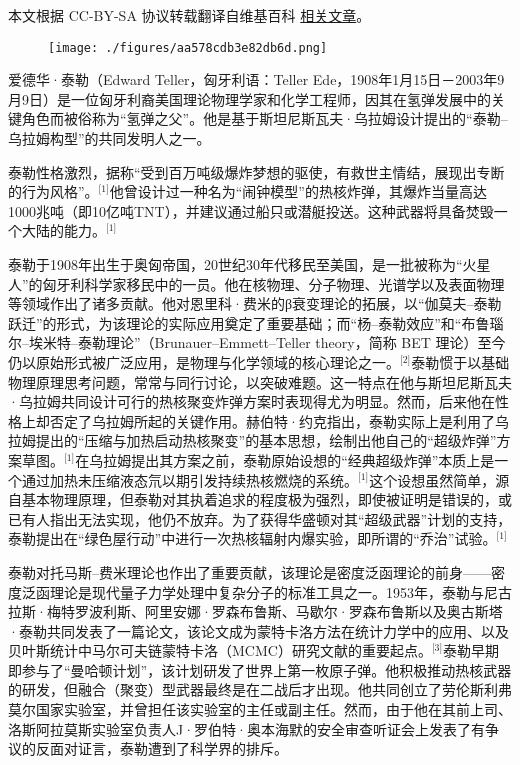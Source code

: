
本文根据 CC-BY-SA 协议转载翻译自维基百科 \href{https://en.wikipedia.org/wiki/Edward_Teller}{相关文章}。

\begin{figure}[ht]
\centering
\texttt{[image: ./figures/aa578cdb3e82db6d.png]}
\caption{} \label{fig_ADHTL_1}
\end{figure}
爱德华·泰勒（Edward Teller，匈牙利语：Teller Ede，1908年1月15日－2003年9月9日）是一位匈牙利裔美国理论物理学家和化学工程师，因其在氢弹发展中的关键角色而被俗称为“氢弹之父”。他是基于斯坦尼斯瓦夫·乌拉姆设计提出的“泰勒–乌拉姆构型”的共同发明人之一。

泰勒性格激烈，据称“受到百万吨级爆炸梦想的驱使，有救世主情结，展现出专断的行为风格”。\(^\text{[1]}\)他曾设计过一种名为“闹钟模型”的热核炸弹，其爆炸当量高达1000兆吨（即10亿吨TNT），并建议通过船只或潜艇投送。这种武器将具备焚毁一个大陆的能力。\(^\text{[1]}\)

泰勒于1908年出生于奥匈帝国，20世纪30年代移民至美国，是一批被称为“火星人”的匈牙利科学家移民中的一员。他在核物理、分子物理、光谱学以及表面物理等领域作出了诸多贡献。他对恩里科·费米的β衰变理论的拓展，以“伽莫夫–泰勒跃迁”的形式，为该理论的实际应用奠定了重要基础；而“杨–泰勒效应”和“布鲁瑙尔–埃米特–泰勒理论”（Brunauer–Emmett–Teller theory，简称 BET 理论）至今仍以原始形式被广泛应用，是物理与化学领域的核心理论之一。\(^\text{[2]}\)泰勒惯于以基础物理原理思考问题，常常与同行讨论，以突破难题。这一特点在他与斯坦尼斯瓦夫·乌拉姆共同设计可行的热核聚变炸弹方案时表现得尤为明显。然而，后来他在性格上却否定了乌拉姆所起的关键作用。赫伯特·约克指出，泰勒实际上是利用了乌拉姆提出的“压缩与加热启动热核聚变”的基本思想，绘制出他自己的“超级炸弹”方案草图。\(^\text{[1]}\)在乌拉姆提出其方案之前，泰勒原始设想的“经典超级炸弹”本质上是一个通过加热未压缩液态氘以期引发持续热核燃烧的系统。\(^\text{[1]}\)这个设想虽然简单，源自基本物理原理，但泰勒对其执着追求的程度极为强烈，即使被证明是错误的，或已有人指出无法实现，他仍不放弃。为了获得华盛顿对其“超级武器”计划的支持，泰勒提出在“绿色屋行动”中进行一次热核辐射内爆实验，即所谓的“乔治”试验。\(^\text{[1]}\)

泰勒对托马斯–费米理论也作出了重要贡献，该理论是密度泛函理论的前身——密度泛函理论是现代量子力学处理中复杂分子的标准工具之一。1953年，泰勒与尼古拉斯·梅特罗波利斯、阿里安娜·罗森布鲁斯、马歇尔·罗森布鲁斯以及奥古斯塔·泰勒共同发表了一篇论文，该论文成为蒙特卡洛方法在统计力学中的应用、以及贝叶斯统计中马尔可夫链蒙特卡洛（MCMC）研究文献的重要起点。\(^\text{[3]}\)泰勒早期即参与了“曼哈顿计划”，该计划研发了世界上第一枚原子弹。他积极推动热核武器的研发，但融合（聚变）型武器最终是在二战后才出现。他共同创立了劳伦斯利弗莫尔国家实验室，并曾担任该实验室的主任或副主任。然而，由于他在其前上司、洛斯阿拉莫斯实验室负责人J·罗伯特·奥本海默的安全审查听证会上发表了有争议的反面对证言，泰勒遭到了科学界的排斥。

